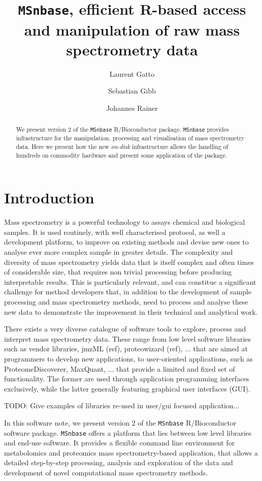\documentclass[journal=jacsat,manuscript=article]{achemso}\usepackage[]{graphicx}\usepackage[]{color}
\author{Laurent Gatto}
\affiliation[UCLouvain]{Computational Biology Unit, de Duve Institute, Universit\'e catholique de Louvain, Brussels, Belgium}
\author{Sebastian Gibb}
\affiliation[University of Greifswald]{Department of Anaesthesiology and Intensive Care of the University Medicine Greifswald, Germany}
\author{Johannes Rainer}
\affiliation[EURAC]{Institute for Biomedicine, Eurac Research, Affiliated Institute of the University of L\"ubeck, Bolzano, Italy}
\title[MSnbase version 2]
  {\texttt{MSnbase}, efficient R-based access and manipulation of raw mass spectrometry data}
\begin{document}

\begin{abstract} %
  We present version 2 of the \texttt{MSnbase} R/Bioconductor
  package. \texttt{MSnbase} provides infrastructure for the
  manipulation, processing and visualisation of mass spectrometry
  data. Here we present how the new \textit{on-disk} infrastructure
  allows the handling of hundreds on commodity hardware and present
  some application of the package.
\end{abstract}



\section{Introduction}

Mass spectrometry is a powerful technology to assays chemical and
biological samples. It is used routinely, with well characterised
protocol, as well a development platform, to improve on existing
methods and devise new ones to analyse ever more complex sample in
greater details. The complexity and diversity of mass spectrometry
yields data that is itself complex and often times of considerable
size, that requires non trivial processing before producing
interpretable results. This is particularly relevant, and can
constitue a significant challenge for method developers that, in
addition to the development of sample processing and mass spectrometry
methods, need to process and analyse these new data to demonstrate the
improvement in their technical and analytical work.


There exists a very diverse catalogue of software tools to explore,
process and interpret mass spectrometry data. These range from low
level software libraries such as vendor libraries, jmzML (ref),
proteowizard (ref), ... that are aimed at programmers to develop new
applications, to user-oriented applications, such as
ProteomeDiscoverer, MaxQuant, ... that provide a limited and fixed set
of functionality. The former are used through application programming
interfaces exclusively, while the latter generally featuring graphical
user interfaces (GUI).

TODO: Give examples of libraries re-used in user/gui focused
application...


In this software note, we present version 2 of the \texttt{MSnbase}
\cite{Gatto:2012} R/Bioconductor software package. \texttt{MSnbase}
offers a platform that lies between low level libraries and end-use
software. It provides a flexible command line environment for
metabolomics and proteomics mass spectrometry-based application, that
allows a detailed step-by-step processing, analysis and exploration of
the data and development of novel computational mass spectrometry
methods.
\end{document}
